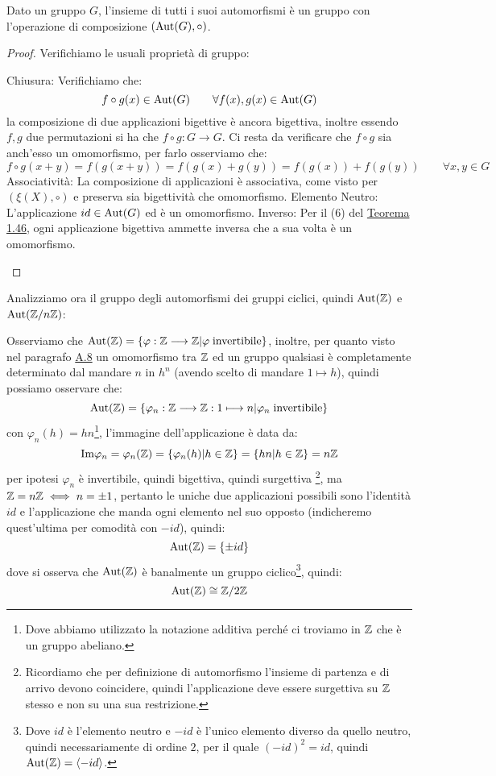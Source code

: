 \documentclass[11pt]{scrartcl}
\begin{document}
\begin{proposition}
Dato un gruppo $G$, l'insieme di tutti i suoi automorfismi è un gruppo con l'operazione di composizione $\left(\operatorname{Aut}(G),\circ\right)$.
\end{proposition}

\begin{proof}
Verifichiamo le usuali proprietà di gruppo:
	\begin{enumerate}[(a)]
	\ii Chiusura: Verifichiamo che:
		\[ f \circ g (x) \in \operatorname{Aut}(G)
		\qquad
		\forall f(x),g(x) \in \operatorname{Aut}(G)
		\]
	la composizione di due applicazioni bigettive è ancora bigettiva, inoltre essendo $f,g$ due permutazioni si ha che $f\circ g : G \longrightarrow G$. Ci resta da verificare che $f \circ g$ sia anch'esso un omomorfismo, per farlo osserviamo che:
		\[ f \circ g (x+y) = f(g(x+y)) = f(g(x)+g(y)) = f(g(x)) + f(g(y))
		\qquad
		\forall x,y \in G 
		\]
	\ii Associatività: La composizione di applicazioni è associativa, come visto per \hyperref[xi]{$(\xi(X), \circ)$} e preserva sia bigettività che omomorfismo.
	\ii Elemento Neutro: L'applicazione $id \in \operatorname{Aut}(G)$ ed è un omomorfismo.
	\ii Inverso: Per il (6) del \hyperref[thm:g_quattro]{Teorema 1.46}, ogni applicazione bigettiva ammette inversa che a sua volta è un omomorfismo.
	\end{enumerate}
\end{proof}

Analizziamo ora il gruppo degli automorfismi dei gruppi ciclici, quindi $\Aut(\ZZ)$ e $\operatorname{Aut}({\mathbb Z}/n{\mathbb Z})$:

\begin{remark}
[$\Aut(\ZZ)$]
Osserviamo che $\operatorname{Aut}(\mathbb Z) = \left\{\varphi: \mathbb Z \longrightarrow \mathbb Z | \varphi \; \text{invertibile}\right\}$, inoltre, per quanto visto nel paragrafo \hyperref[A8]{A.8} un omomorfismo tra $\mathbb Z$ ed un gruppo qualsiasi è completamente determinato dal mandare $n$ in $h^n$ (avendo scelto di mandare $1\longmapsto h$), quindi possiamo osservare che:
	\[ \operatorname{Aut}(\mathbb Z) = \left\{\varphi_n: \mathbb Z \longrightarrow \mathbb Z: 1 \longmapsto n | \varphi_n \; \text{invertibile}\right\}
	\]
con $\varphi_n(h) = hn$\footnote{Dove abbiamo utilizzato la notazione additiva perché ci troviamo in $\mathbb Z$ che è un gruppo abeliano.}, l'immagine dell'applicazione è data da:
	\[ \text{Im}\varphi_n = \varphi_n(\mathbb Z) = \{\varphi_n(h) | h\in \mathbb Z\}= \{hn | h \in \mathbb Z\} = n\mathbb Z
	\]
per ipotesi $\varphi_n$ è invertibile, quindi bigettiva, quindi surgettiva \footnote{Ricordiamo che per definizione di automorfismo l'insieme di partenza e di arrivo devono coincidere, quindi l'applicazione deve essere surgettiva su $\mathbb Z$ stesso e non su una sua restrizione.}, ma $\mathbb Z = n\mathbb Z \iff n=\pm 1$, pertanto le uniche due applicazioni possibili sono l'identità $id$ e l'applicazione che manda ogni elemento nel suo opposto (indicheremo quest'ultima per comodità con $-id$), quindi:
	\[ \operatorname{Aut}(\mathbb Z)=\{\pm id\}
	\]
dove si osserva che $\Aut(\ZZ)$ è banalmente un gruppo ciclico\footnote{Dove $id$ è l'elemento neutro e $-id$ è l'unico elemento diverso da quello neutro, quindi necessariamente di ordine $2$, per il quale $(-id)^2 = id$, quindi $\operatorname{Aut}(\mathbb Z)=\left<-id\right>$.}, quindi:
	\[ \operatorname{Aut}(\mathbb Z) \cong \mathbb Z/2\mathbb Z
	\]
\end{remark}
\end{document}
